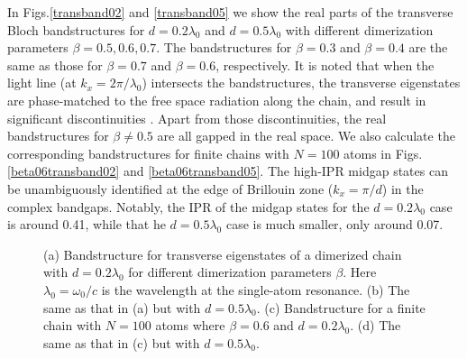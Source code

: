 \documentclass[aps,pra,reprint,groupedaddress,nofootinbib,longbibliography,showpacs]{revtex4-1}
\begin{document}
In Figs.\ref{transband02} and \ref{transband05} we show the real parts of the transverse Bloch bandstructures for $d=0.2\lambda_0$ and $d=0.5\lambda_0$ with different dimerization parameters $\beta=0.5, 0.6, 0.7$. The bandstructures for $\beta=0.3$ and $\beta=0.4$ are the same as those for $\beta=0.7$ and $\beta=0.6$, respectively. It is noted that when the light line (at $k_x=2\pi/\lambda_0$) intersects the bandstructures, the transverse eigenstates are phase-matched to the free space radiation along the chain, and result in significant discontinuities \cite{weberPRB2004,pocockArxiv2017}. Apart from those discontinuities, the real bandstructures for $\beta\neq0.5$ are all gapped in the real space. We also calculate the corresponding bandstructures for finite chains with $N=100$ atoms in Figs.\ref{beta06transband02} and \ref{beta06transband05}. The high-IPR midgap states can be unambiguously identified at the edge of Brillouin zone ($k_x=\pi/d$) in the complex bandgaps. Notably, the IPR of the midgap states for the $d=0.2\lambda_0$ case is around 0.41, while that he $d=0.5\lambda_0$ case is much smaller, only around 0.07.
\begin{figure}[htbp]
	\centering
	\flushleft
\hspace{0.01in}
	\hspace{0.01in}
	\hspace{0.01in}
\hspace{0.01in}

	\caption{(a) Bandstructure for transverse eigenstates of a dimerized chain with $d=0.2\lambda_0$ for different dimerization parameters $\beta$. Here $\lambda_0=\omega_0/c$ is the wavelength at the single-atom resonance. (b) The same as that in (a) but with $d=0.5\lambda_0$. (c) Bandstructure for a finite chain with $N=100$ atoms where $\beta=0.6$ and $d=0.2\lambda_0$. (d) The same as that in (c) but with $d=0.5\lambda_0$. }
	
	\label{transband}
\end{figure}
\end{document}
